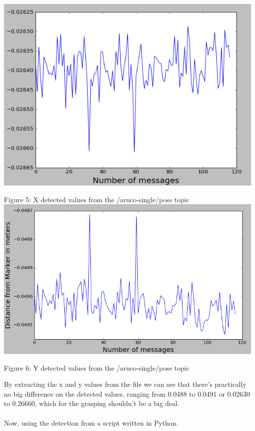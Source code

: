 \documentclass{article}
\begin{document}
\begin{center}
    \includegraphics[scale=0.5]{pictures/pic6.png}
    
    Figure 5: X detected values from the /aruco-single/pose topic
    \includegraphics[scale=0.5]{pictures/pic7.png}
    
    Figure 6: Y detected values from the /aruco-single/pose topic
\end{center}
By extracting the x and y values from the file we can see that there's practically no big difference on the detected values, ranging from 0.0488 to 0.0491 or 0.02630 to 0.26660, which for the grasping shouldn't be a big deal.\\
\\
Now, using the detection from a script written in Python.
\end{document}
